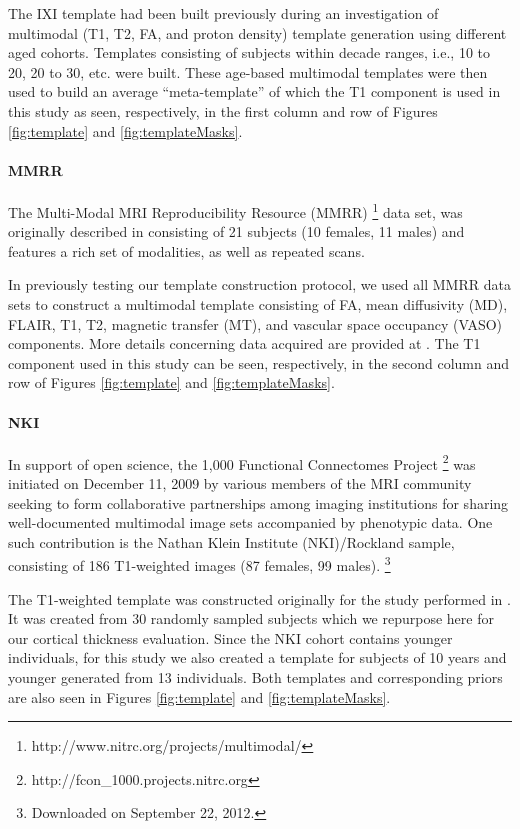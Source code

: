 The IXI template had been built previously during an investigation of  multimodal 
(T1, T2, FA, and proton density) template generation using different 
aged cohorts.  Templates consisting of subjects
within decade ranges, i.e., 10 to 20, 20 to 30, etc. were built.  These
age-based multimodal templates were then used to build an average ``meta-template'' of which 
the T1 component is used in this study as seen, respectively, in the first column and row of 
Figures \ref{fig:template} and \ref{fig:templateMasks}.

\paragraph{MMRR}
The Multi-Modal MRI Reproducibility Resource (MMRR)%
\footnote{
http://www.nitrc.org/projects/multimodal/
} 
data set, was originally described in \cite{landman2011} consisting of 
21 subjects (10 females, 11 males) and features a rich set of modalities, 
as well as repeated scans.

In previously testing our template construction protocol, we used all 
MMRR data sets to construct a multimodal template consisting of
FA, mean diffusivity (MD), FLAIR, T1, T2, magnetic transfer (MT), and 
vascular space occupancy (VASO) components.  More details concerning 
data acquired are provided at \cite{landman2011}.  The T1 component used in 
this study can be seen, respectively, in the second column and row of 
Figures \ref{fig:template} and \ref{fig:templateMasks}.

\paragraph{NKI}
In support of open science, the 1,000 Functional Connectomes Project%
\footnote{ 
http://fcon\_1000.projects.nitrc.org
}
was initiated on December 11, 2009 by various members of the MRI community
seeking to form collaborative partnerships among imaging institutions for
sharing well-documented multimodal image sets accompanied by phenotypic data.
One such contribution is the Nathan Klein Institute (NKI)/Rockland sample,
consisting of 186 T1-weighted
images (87 females, 99 males).%
\footnote{
Downloaded on September 22, 2012.
}

The T1-weighted template was constructed originally for the study performed
in \cite{tustison2013}.  It was created from 30 randomly sampled subjects 
which we repurpose here for our cortical thickness evaluation.  Since the 
NKI cohort contains younger individuals, for this study we also created a 
template for subjects of 10 years and younger generated from 13 individuals.
Both templates and corresponding priors are also seen in Figures \ref{fig:template} and \ref{fig:templateMasks}.

